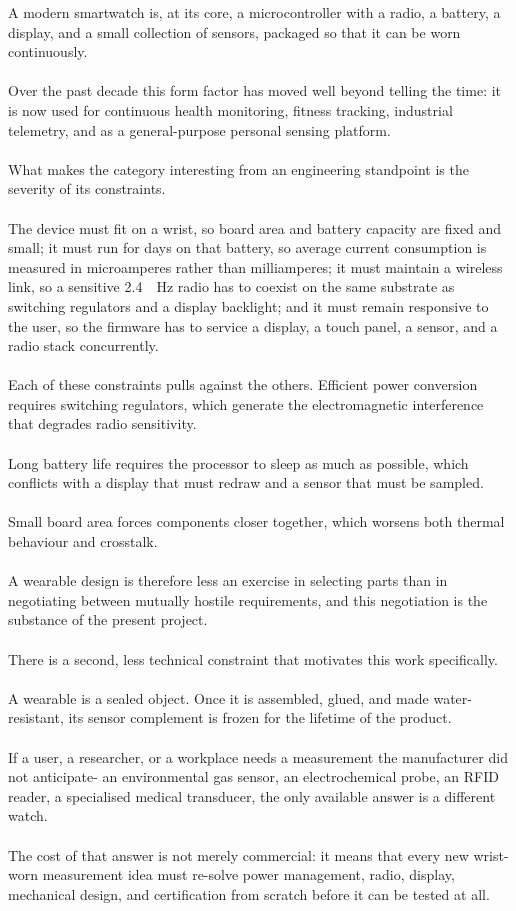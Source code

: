\documentclass[12pt, a4paper]{article}
\begin{document}
A modern smartwatch is, at its core, a microcontroller with a radio, a battery,
a display, and a small collection of sensors, packaged so that it can be worn
continuously.\\\\
Over the past decade this form factor has moved well beyond
telling the time: it is now used for continuous health monitoring, fitness
tracking, industrial telemetry, and as a general-purpose personal sensing
platform.\\\\
What makes the category interesting from an engineering standpoint is
the severity of its constraints.\\\\
The device must fit on a wrist, so board area
and battery capacity are fixed and small; it must run for days on that battery,
so average current consumption is measured in microamperes rather than
milliamperes; it must maintain a wireless link, so a sensitive \SI{2.4}{\giga
\hertz} radio has to coexist on the same substrate as switching regulators and a
display backlight; and it must remain responsive to the user, so the firmware has
to service a display, a touch panel, a sensor, and a radio stack concurrently.\\\\
Each of these constraints pulls against the others. Efficient power conversion
requires switching regulators, which generate the electromagnetic interference
that degrades radio sensitivity.\\\\
Long battery life requires the processor to
sleep as much as possible, which conflicts with a display that must redraw and a
sensor that must be sampled.\\\\
Small board area forces components closer together,
which worsens both thermal behaviour and crosstalk.\\\\
A wearable design is
therefore less an exercise in selecting parts than in negotiating between
mutually hostile requirements, and this negotiation is the substance of the
present project.\\\\
There is a second, less technical constraint that motivates this work
specifically.\\\\
A wearable is a sealed object. Once it is assembled, glued, and
made water-resistant, its sensor complement is frozen for the lifetime of the
product.\\\\
If a user, a researcher, or a workplace needs a measurement the
manufacturer did not anticipate- an environmental gas sensor, an
electrochemical probe, an RFID reader, a specialised medical transducer, the
only available answer is a different watch.\\\\
The cost of that answer is not
merely commercial: it means that every new wrist-worn measurement idea must
re-solve power management, radio, display, mechanical design, and certification
from scratch before it can be tested at all.
\end{document}
